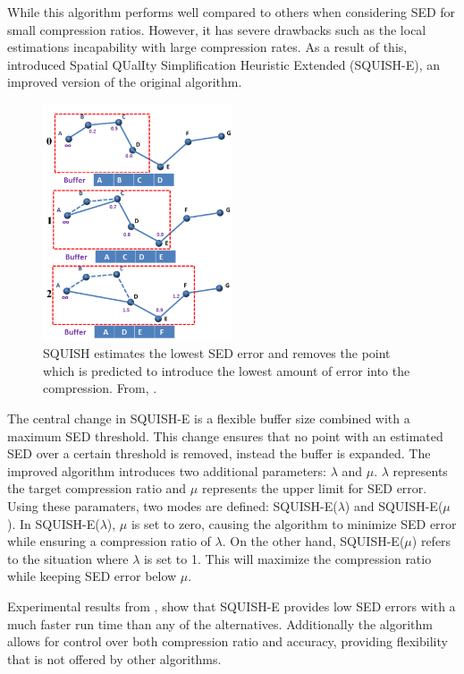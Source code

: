 While this algorithm performs well compared to others when considering SED for small compression ratios. However, it has severe drawbacks such as the local estimations incapability with large compression rates. As a result of this, \cite{muckell2014compression} introduced Spatial QUalIty Simplification Heuristic Extended (SQUISH-E), an improved version of the original algorithm.
\begin{figure}
    \includegraphics[width=0.5\textwidth]{./figures/squish.png}
    \caption{SQUISH estimates the lowest SED error
        and removes the point which is predicted to introduce
        the lowest amount of error into the compression. From, \cite{muckell2011squish}.}
    \label{fig:squish}
\end{figure}

The central change in SQUISH-E is a flexible buffer size combined with a maximum SED threshold. This change ensures that no point with an estimated SED over a certain threshold is removed, instead the buffer is expanded. The improved algorithm introduces two additional parameters: $\lambda$ and $\mu$. $\lambda$ represents the target compression ratio and $\mu$ represents the upper limit for SED error. Using these paramaters, two modes are defined: SQUISH-E($\lambda$) and SQUISH-E($\mu$). In SQUISH-E($\lambda$), $\mu$ is set to zero, causing the algorithm to minimize SED error while ensuring a compression ratio of $\lambda$. On the other hand, SQUISH-E($\mu$) refers to the situation where $\lambda$ is set to 1. This will maximize the compression ratio while keeping SED error below $\mu$.

Experimental results from \cite{muckell2014compression}, show that SQUISH-E provides low SED errors with a much faster run time than any of the alternatives. Additionally the algorithm allows for control over both compression ratio and accuracy, providing flexibility that is not offered by other algorithms.

